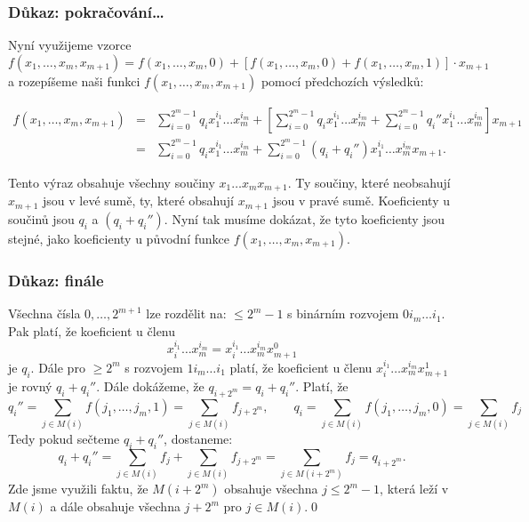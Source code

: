 \documentclass{beamer}
\begin{document}
\begin{frame}[t,fragile]\frametitle{Důkaz: pokračování\dots} 
\footnotesize
Nyní využijeme vzorce 
$$
f(x_1,\dots,x_m, x_{m+1}) = f(x_1,\dots,x_m,0)+[f(x_1,\dots, x_m,0)+f(x_1, \dots, x_m,1)]\cdot x_{m+1}
$$
a rozepíšeme naši funkci $f(x_1,\dots,x_m, x_{m+1})$ pomocí předchozích výsledků:

\begin{eqnarray*}
f(x_1,\dots,x_m, x_{m+1}) &=&  \sum_{i=0}^{2^m-1}q_i x_1^{i_1}\dots x_m^{i_m}+\left[\sum_{i=0}^{2^m-1}q_i x_1^{i_1}\dots x_m^{i_m}+\sum_{i=0}^{2^m-1}q_i'' x_1^{i_1}\dots x_m^{i_m}\right]x_{m+1}\\
&=& \sum_{i=0}^{2^m-1}q_i x_1^{i_1}\dots x_m^{i_m}+\sum_{i=0}^{2^m-1}(q_i+q_i'') x_1^{i_1}\dots x_m^{i_m}x_{m+1}.
\end{eqnarray*}

Tento výraz obsahuje všechny součiny $x_1\dots x_mx_{m+1}$. Ty součiny, které neobsahují $x_{m+1}$ jsou v levé sumě, ty, které obsahují $x_{m+1}$ jsou v pravé sumě. Koeficienty u součinů jsou $q_i$ a $(q_i+q_i'')$. Nyní tak musíme dokázat, že tyto koeficienty jsou stejné, jako koeficienty u původní funkce $f(x_1,\dots,x_m, x_{m+1})$.


\end{frame}


\begin{frame}[t,fragile]\frametitle{Důkaz: finále} 
\footnotesize
Všechna čísla $0,\dots,2^{m+1}$ lze rozdělit na: $\le2^m-1$ s binárním rozvojem $0i_m\dots i_1$. Pak platí, že koeficient u členu
$$
x_i^{i_1}\dots x_m^{i_m}=x_i^{i_1}\dots x_m^{i_m}x_{m+1}^{0}
$$
je $q_i$. Dále pro $\ge2^m$ s rozvojem $1i_m\dots i_1$ platí, že koeficient u členu $x_i^{i_1}\dots x_m^{i_m}x_{m+1}^1$ je rovný $q_i+q_i''$. Dále dokážeme, že $q_{i+2^m}=q_i+q_i''$. Platí, že
$$
q_i''=\sum_{j\in M(i)} f(j_1,\dots,j_m,1) =\sum_{j\in M(i)}f_{j+2^m},\qquad q_i=\sum_{j\in M(i)} f(j_1,\dots,j_m,0)=\sum_{j\in M(i)}f_j
$$
Tedy pokud sečteme $q_i+q_i''$, dostaneme:
$$
q_i+q_i''=\sum_{j\in M(i)}f_j+\sum_{j\in M(i)}f_{j+2^m}=\sum_{j\in M(i+2^m)}f_j=q_{i+2^m}.
$$
Zde jsme využili faktu, že $M(i+2^m)$ obsahuje všechna $j\le 2^m-1$, která leží v $M(i)$ a dále obsahuje všechna $j+2^m$ pro $j\in M(i)$.\qed
\end{frame}
\end{document}
